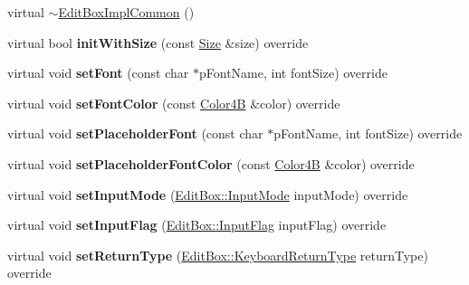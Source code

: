 \begin{DoxyCompactItemize}
virtual \hyperlink{classui_1_1EditBoxImplCommon_ae5703f871c2ccfedbfa978feac26f4ef}{$\sim$\+Edit\+Box\+Impl\+Common} ()
\item 
\mbox{\label{classui_1_1EditBoxImplCommon_aa4ece9fc415992376dca036d5b85d933}} 
virtual bool {\bfseries init\+With\+Size} (const \hyperlink{classSize}{Size} \&size) override
\item 
\mbox{\label{classui_1_1EditBoxImplCommon_aa5bd2ad4cb84a1c635ac90b89e1935a6}} 
virtual void {\bfseries set\+Font} (const char $\ast$p\+Font\+Name, int font\+Size) override
\item 
\mbox{\label{classui_1_1EditBoxImplCommon_aa7e35401ffd27e7902ddd3b0728f37c3}} 
virtual void {\bfseries set\+Font\+Color} (const \hyperlink{structColor4B}{Color4B} \&color) override
\item 
\mbox{\label{classui_1_1EditBoxImplCommon_a8c140a9a00b700ab4fe28466253c39ae}} 
virtual void {\bfseries set\+Placeholder\+Font} (const char $\ast$p\+Font\+Name, int font\+Size) override
\item 
\mbox{\label{classui_1_1EditBoxImplCommon_aa9dfb78d7ce6f35b5bec2c18a7b93dbd}} 
virtual void {\bfseries set\+Placeholder\+Font\+Color} (const \hyperlink{structColor4B}{Color4B} \&color) override
\item 
\mbox{\label{classui_1_1EditBoxImplCommon_aa35fde892323f24b633a1acce592663f}} 
virtual void {\bfseries set\+Input\+Mode} (\hyperlink{classui_1_1EditBox_a7a1bfe8f3ba218bedfcf5451ec3ce01a}{Edit\+Box\+::\+Input\+Mode} input\+Mode) override
\item 
\mbox{\label{classui_1_1EditBoxImplCommon_af87198a4d85e92b8f784af4ae044d6b3}} 
virtual void {\bfseries set\+Input\+Flag} (\hyperlink{classui_1_1EditBox_af02f13ee9fba51d59bb3111e200848c8}{Edit\+Box\+::\+Input\+Flag} input\+Flag) override
\item 
\mbox{\label{classui_1_1EditBoxImplCommon_ab4c50b7ef73c09dd77f3b46597452e35}} 
virtual void {\bfseries set\+Return\+Type} (\hyperlink{classui_1_1EditBox_a1e1285b6f742975b26bdeb8108ca6e51}{Edit\+Box\+::\+Keyboard\+Return\+Type} return\+Type) override

\end{DoxyCompactItemize}

